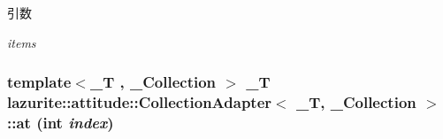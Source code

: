 \begin{DoxyParams}{引数}
\item[{\em items}]\end{DoxyParams}
\hypertarget{classlazurite_1_1attitude_1_1_collection_adapter_3_01___t_00_01___collection_01_4_af303ff4c011ea4ddcec02b7e5e0bd399}{
\subsubsection[{at}]{\setlength{\rightskip}{0pt plus 5cm}template$<$\_\-T , \_\-Collection $>$ \_\-T lazurite::attitude::CollectionAdapter$<$ \_\-T, \_\-Collection $>$::at (int {\em index})}}
\label{classlazurite_1_1attitude_1_1_collection_adapter_3_01___t_00_01___collection_01_4_af303ff4c011ea4ddcec02b7e5e0bd399}

